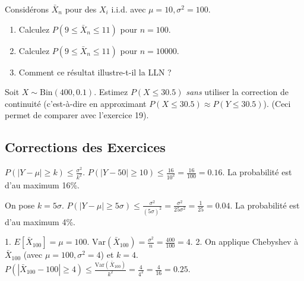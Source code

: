 \begin{exercicebox}
Considérons $\bar{X}_n$ pour des $X_i$ i.i.d. avec $\mu=10, \sigma^2=100$.
\begin{enumerate}
    \item Calculez $P(9 \le \bar{X}_n \le 11)$ pour $n=100$.
    \item Calculez $P(9 \le \bar{X}_n \le 11)$ pour $n=10000$.
    \item Comment ce résultat illustre-t-il la LLN ?
\end{enumerate}
\end{exercicebox}

\begin{exercicebox}
Soit $X \sim \text{Bin}(400, 0.1)$. Estimez $P(X \le 30.5)$ \textit{sans} utiliser la correction de continuité (c'est-à-dire en approximant $P(X \le 30.5) \approx P(Y \le 30.5)$).
(Ceci permet de comparer avec l'exercice 19).
\end{exercicebox}


\subsection{Corrections des Exercices}

\begin{correctionbox}
$P(|Y - \mu| \ge k) \le \frac{\sigma^2}{k^2}$.
$P(|Y - 50| \ge 10) \le \frac{16}{10^2} = \frac{16}{100} = 0.16$.
La probabilité est d'au maximum 16\%.
\end{correctionbox}

\begin{correctionbox}
On pose $k = 5\sigma$.
$P(|Y - \mu| \ge 5\sigma) \le \frac{\sigma^2}{(5\sigma)^2} = \frac{\sigma^2}{25\sigma^2} = \frac{1}{25} = 0.04$.
La probabilité est d'au maximum 4\%.
\end{correctionbox}

\begin{correctionbox}
1.  $E[\bar{X}_{100}] = \mu = 100$.
    $\text{Var}(\bar{X}_{100}) = \frac{\sigma^2}{n} = \frac{400}{100} = 4$.
2.  On applique Chebyshev à $\bar{X}_{100}$ (avec $\mu=100, \sigma^2=4$) et $k=4$.
    $P(|\bar{X}_{100} - 100| \ge 4) \le \frac{\text{Var}(\bar{X}_{100})}{k^2} = \frac{4}{4^2} = \frac{4}{16} = 0.25$.
\end{correctionbox}

